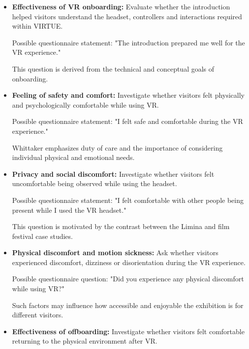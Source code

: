 \begin{itemize}
    \item \textbf{Effectiveness of VR onboarding:}
    Evaluate whether the introduction helped visitors
    understand the headset, controllers and interactions
    required within VIRTUE.

    Possible questionnaire statement:
    "The introduction prepared me well for the VR experience."

    This question is derived from the technical and
    conceptual goals of onboarding.
    \cite[p.~88]{whittaker_onboarding_2025}
    \cite[pp.~101--102]{whittaker_onboarding_2025}

    \item \textbf{Feeling of safety and comfort:}
    Investigate whether visitors felt physically and
    psychologically comfortable while using VR.

    Possible questionnaire statement:
    "I felt safe and comfortable during the VR experience."

    Whittaker emphasizes duty of care and the importance
    of considering individual physical and emotional needs.
    \cite[pp.~101--102]{whittaker_onboarding_2025}

    \item \textbf{Privacy and social discomfort:}
    Investigate whether visitors felt uncomfortable
    being observed while using the headset.

    Possible questionnaire statement:
    "I felt comfortable with other people being present
    while I used the VR headset."

    This question is motivated by the contrast between
    the Limina and film festival case studies.
    \cite[pp.~90--91]{whittaker_onboarding_2025}

    \item \textbf{Physical discomfort and motion sickness:}
    Ask whether visitors experienced discomfort,
    dizziness or disorientation during the VR experience.

    Possible questionnaire question:
    "Did you experience any physical discomfort
    while using VR?"

    Such factors may influence how accessible and
    enjoyable the exhibition is for different visitors.
    \cite[pp.~88--89]{whittaker_onboarding_2025}
    \cite[p.~101]{whittaker_onboarding_2025}

    \item \textbf{Effectiveness of offboarding:}
    Investigate whether visitors felt comfortable
    returning to the physical environment after VR.


\end{itemize}
